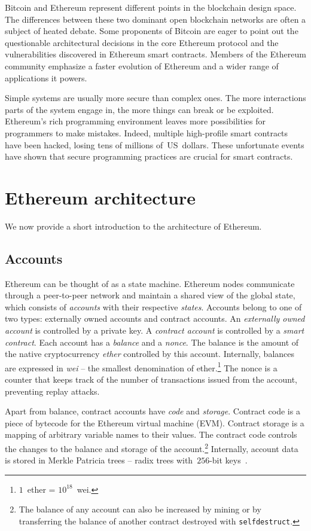 Bitcoin and Ethereum represent different points in the blockchain design space.
The differences between these two dominant open blockchain networks are often a subject of heated debate.
Some proponents of Bitcoin are eager to point out the questionable architectural decisions in the core Ethereum protocol and the vulnerabilities discovered in Ethereum smart contracts.
Members of the Ethereum community emphasize a faster evolution of Ethereum and a wider range of applications it powers.

Simple systems are usually more secure than complex ones.
The more interactions parts of the system engage in, the more things can break or be exploited.
Ethereum's rich programming environment leaves more possibilities for programmers to make mistakes.
Indeed, multiple high-profile smart contracts have been hacked, losing tens of millions of~US~dollars.
These unfortunate events have shown that secure programming practices are crucial for smart contracts.


\section{Ethereum architecture}

We now provide a short introduction to the architecture of Ethereum.

\subsection{Accounts}

Ethereum can be thought of as a state machine.
Ethereum nodes communicate through a peer-to-peer network and maintain a shared view of the global state, which consists of \textit{accounts} with their respective \textit{states}.
Accounts belong to one of two types: externally owned accounts and contract accounts.
An \textit{externally owned account} is controlled by a private key.
A \textit{contract account} is controlled by a \textit{smart contract}.
Each account has a \textit{balance} and a \textit{nonce}.
The balance is the amount of the native cryptocurrency \textit{ether} controlled by this account.
Internally, balances are expressed in \textit{wei} -- the smallest denomination of ether.\footnote{$1$~ether = $10^{18}$~wei.}
The nonce is a counter that keeps track of the number of transactions issued from the account, preventing replay attacks.

Apart from balance, contract accounts have \textit{code} and \textit{storage}.
Contract code is a piece of bytecode for the Ethereum virtual machine (EVM).
Contract storage is a mapping of arbitrary variable names to their values.
The contract code controls the changes to the balance and storage of the account.\footnote{The balance of any account can also be increased by mining or by transferring the balance of another contract destroyed with \texttt{selfdestruct}.}
Internally, account data is stored in Merkle Patricia trees -- radix trees with~$256$-bit keys~\cite{MPTSpec, Buchman14}.


